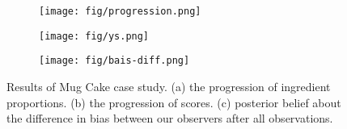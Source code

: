 \begin{figure}
    \centering
    \begin{subfigure}[b]{0.32\textwidth}
        \centering
        \texttt{[image: fig/progression.png]}
        \caption{}
        \label{subfig:exp:progression}
    \end{subfigure}
    \hfill
    \begin{subfigure}[b]{0.32\textwidth}
        \centering
        \texttt{[image: fig/ys.png]}
        \caption{}
        \label{subfig:exp:ys}
    \end{subfigure}
    \hfill
    \begin{subfigure}[b]{0.32\textwidth}
        \centering
        \texttt{[image: fig/bais-diff.png]}
        \caption{}
        \label{subfig:exp:bias-diff}
    \end{subfigure}
    \hfill
    \caption{
        Results of Mug Cake case study.
        (a) the progression of ingredient proportions.
        (b) the progression of scores.
        (c) posterior belief about the difference in bias between our observers after all observations.
    }
    \label{fig:exp-res}
\end{figure}
